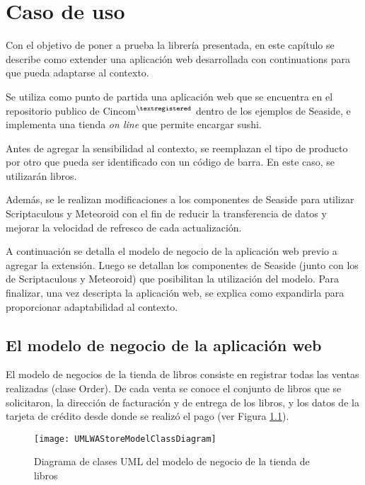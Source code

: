 
\chapter{Caso de uso}
\label{Capitulo 5}

Con el objetivo de poner a prueba la librería presentada, en este capítulo se  describe como extender una aplicación web desarrollada con continuations para que pueda adaptarse al contexto.

Se utiliza como punto de partida una aplicación web que se encuentra en el repositorio publico de Cincom$ ^{\textregistered}$ dentro de los ejemplos de Seaside, e implementa una tienda \emph{on line} que permite encargar sushi.

Antes de agregar la sensibilidad al contexto, se reemplazan el tipo de producto por otro que pueda ser identificado con un código de barra. En este caso, se utilizarán libros.

Además, se le realizan modificaciones a los componentes de Seaside para utilizar Scriptaculous y Meteoroid con el fin de reducir la transferencia de datos y mejorar la velocidad de refresco de cada actualización\cite{Fernandez09}.

A continuación se detalla el modelo de negocio de la aplicación web previo a agregar la extensión. Luego se detallan los componentes de Seaside (junto con los de Scriptaculous y Meteoroid) que posibilitan la utilización del modelo. Para finalizar, una vez descripta la aplicación web, se explica como expandirla para proporcionar adaptabilidad al contexto.


\section{El modelo de negocio de la aplicación web}

El modelo de negocios de la tienda de libros consiste en registrar todas las ventas realizadas (clase Order). De cada venta se conoce el conjunto de libros que se solicitaron, la dirección de facturación y de entrega de los libros, y los datos de la tarjeta de crédito desde donde se realizó el pago (ver Figura \ref{WAStoreModel}).

\begin{figure}[ht!]
\centering
\texttt{[image: UMLWAStoreModelClassDiagram]}
\caption{Diagrama de clases UML del modelo de negocio de la tienda de libros}
\label{WAStoreModel}
\end{figure}

